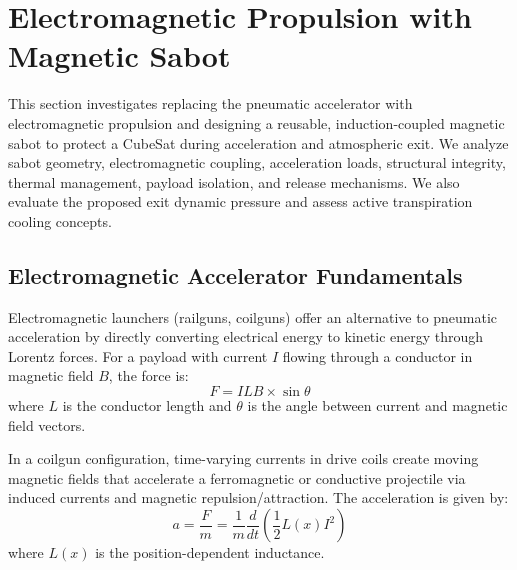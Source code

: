 \section{Electromagnetic Propulsion with Magnetic Sabot}
\label{sec:em_sabot}

This section investigates replacing the pneumatic accelerator with electromagnetic propulsion and designing a reusable, induction-coupled magnetic sabot to protect a CubeSat during acceleration and atmospheric exit. We analyze sabot geometry, electromagnetic coupling, acceleration loads, structural integrity, thermal management, payload isolation, and release mechanisms. We also evaluate the proposed exit dynamic pressure and assess active transpiration cooling concepts.

\subsection{Electromagnetic Accelerator Fundamentals}
Electromagnetic launchers (railguns, coilguns) offer an alternative to pneumatic acceleration by directly converting electrical energy to kinetic energy through Lorentz forces. For a payload with current $I$ flowing through a conductor in magnetic field $B$, the force is:
\begin{equation}
F = I L B \times \sin\theta
\end{equation}
where $L$ is the conductor length and $\theta$ is the angle between current and magnetic field vectors.

In a coilgun configuration, time-varying currents in drive coils create moving magnetic fields that accelerate a ferromagnetic or conductive projectile via induced currents and magnetic repulsion/attraction. The acceleration is given by:
\begin{equation}
a = \frac{F}{m} = \frac{1}{m} \frac{d}{dt} \left( \frac{1}{2} L(x) I^2 \right)
\end{equation}
where $L(x)$ is the position-dependent inductance.

